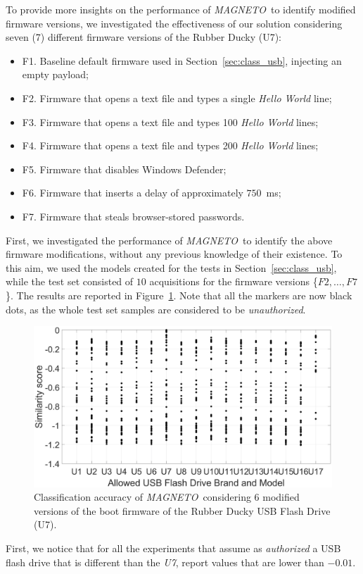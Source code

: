 \documentclass[acmsmall, authorversion]{acmart}
\newcommand{\sol}{\emph{MAGNETO}}
\begin{document}
To provide more insights on the performance of \sol\ to identify modified firmware versions, we investigated the effectiveness of our solution considering seven (7) different firmware versions of the Rubber Ducky (U7):
\begin{itemize}
    \item F1. Baseline default firmware used in Section~\ref{sec:class_usb}, injecting an empty payload; 
    \item F2. Firmware that opens a text file and types a single \emph{Hello World} line;
    \item F3. Firmware that opens a text file and types 100 \emph{Hello World} lines;
    \item F4. Firmware that opens a text file and types 200 \emph{Hello World} lines;
    \item F5. Firmware that disables Windows Defender;
    \item F6. Firmware that inserts a delay of approximately $750$~ms;
    \item F7. Firmware that steals browser-stored passwords.
\end{itemize}
First, we investigated the performance of \sol\ to identify the above firmware modifications, without any previous knowledge of their existence. To this aim, we used the models created for the tests in Section~\ref{sec:class_usb}, while the test set consisted of $10$ acquisitions for the firmware versions \{$F2, \ldots, F7$\}. The results are reported in Figure~\ref{fig:modifiedRD_all}. Note that all the markers are now black dots, as the whole test set samples are considered to be \emph{unauthorized}.
\begin{figure}[htbp]
    \includegraphics[width=.6\columnwidth]{Figures/modified_RD_all_final.png}
    \centering
    \caption{Classification accuracy of \sol\ considering 6 modified versions of the boot firmware of the Rubber Ducky USB Flash Drive (U7).}
    \label{fig:modifiedRD_all}
\end{figure}
First, we notice that for all the experiments that assume as \emph{authorized} a USB flash drive that is different than the \emph{U7}, report values that are lower than $-0.01$. 
\end{document}

